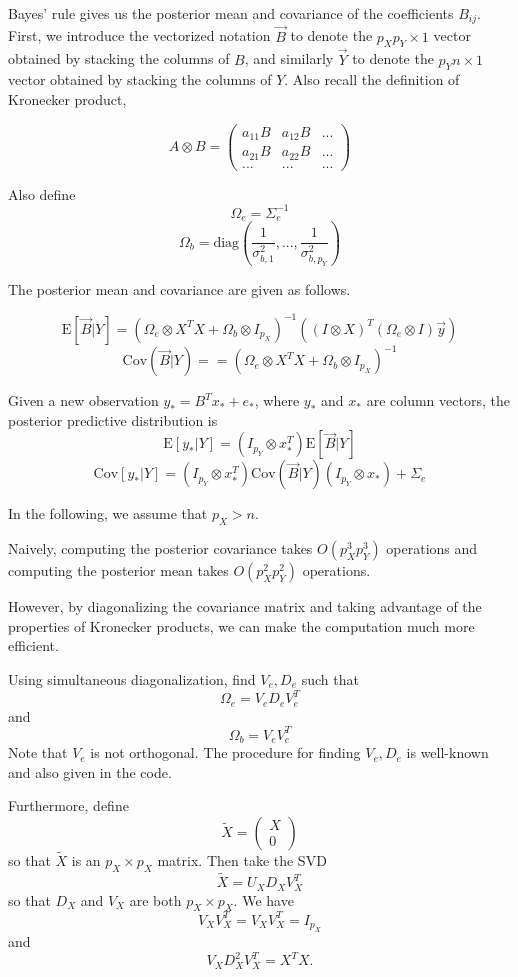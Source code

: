\documentclass[12pt]{article}
\begin{document}
Bayes' rule gives us the posterior mean and covariance of the coefficients $B_{ij}$.
First, we introduce the vectorized notation $\vec{B}$ to denote the $p_X p_Y \times 1$ vector obtained by 
stacking the columns of $B$, and similarly $\vec{Y}$ to denote the $p_Y n \times 1$ vector obtained by stacking the columns of $Y$.  Also recall the definition of Kronecker product,

$$
A \otimes B = \begin{pmatrix}a_{11} B & a_{12} B & ...\\
a_{21} B & a_{22} B & ...\\
... & ... & ...\end{pmatrix}
$$

Also define
$$
\Omega_e = \Sigma_e^{-1}
$$
$$
\Omega_b = \text{diag}\left(\frac{1}{\sigma^2_{b, 1}},..., \frac{1}{\sigma^2_{b, p_Y}}\right)
$$

The posterior mean and covariance are given as follows.

$$
\text{E}[\vec{B}|Y] = (\Omega_e \otimes X^T X + \Omega_b \otimes I_{p_X})^{-1} ((I\otimes X)^T (\Omega_e \otimes I) \vec{y})
$$
$$
\text{Cov}(\vec{B}|Y) = = (\Omega_e \otimes X^T X + \Omega_b \otimes I_{p_X})^{-1}
$$

Given a new observation $y_* = B^T x_* + e_*$, where $y_*$ and $x_*$ are column vectors,
the posterior predictive distribution is
$$
\text{E}[y_* | Y] = (I_{p_Y} \otimes x_*^T) \text{E}[\vec{B}|Y]
$$
$$
\text{Cov}[y_* | Y] = (I_{p_Y} \otimes x_*^T) \text{Cov}(\vec{B}|Y) (I_{p_Y} \otimes x_*) + \Sigma_e
$$


In the following, we assume that $p_X > n$.

Naively, computing the posterior covariance takes $O(p_X^3 p_Y^3)$ operations
and computing the posterior mean takes $O(p_X^2 p_Y^2)$ operations.

However, by diagonalizing the covariance matrix and taking advantage of the properties of Kronecker products, we can make the computation much more efficient.

Using simultaneous diagonalization, find $V_e, D_e$ such that
$$
\Omega_e = V_e D_e V_e^T
$$
and
$$
\Omega_b = V_e V_e^T
$$
Note that $V_e$ is not orthogonal.
The procedure for finding $V_e, D_e$ is well-known and also given in the code.

Furthermore, define 
$$\tilde{X} = \begin{pmatrix} X \\ 0\end{pmatrix}$$ so that $\tilde{X}$ is an $p_X \times p_X$ matrix.
Then take the SVD
$$
\tilde{X} = U_X D_X V_X^T
$$
so that $D_X$ and $V_X$ are both  $p_X \times p_X$.
We have
$$
V_X V_X^T = V_X V_X^T = I_{p_X}
$$
and
$$
V_X D_X^2 V_X^T = X^T X.
$$
\end{document}
